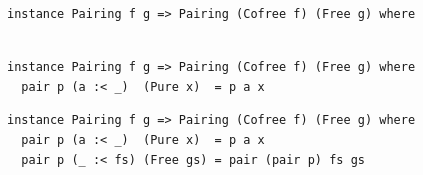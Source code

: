 \documentclass{beamer}
\begin{document}
\begin{frame}[fragile]
  \begin{overprint}
  \begin{verbatim}
instance Pairing f g => Pairing (Cofree f) (Free g) where


  \end{verbatim}
  \begin{verbatim}
instance Pairing f g => Pairing (Cofree f) (Free g) where
  pair p (a :< _)  (Pure x)  = p a x

  \end{verbatim}
  \begin{verbatim}
instance Pairing f g => Pairing (Cofree f) (Free g) where
  pair p (a :< _)  (Pure x)  = p a x
  pair p (_ :< fs) (Free gs) = pair (pair p) fs gs
  \end{verbatim}
  \end{overprint}
\end{frame}
\end{document}

